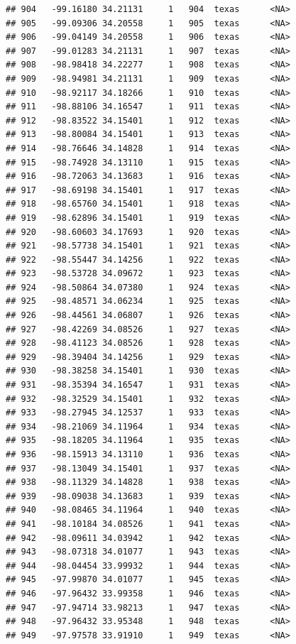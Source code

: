 \documentclass[
]{article}
\begin{document}
\begin{verbatim}
## 904   -99.16180 34.21131     1   904  texas      <NA>
## 905   -99.09306 34.20558     1   905  texas      <NA>
## 906   -99.04149 34.20558     1   906  texas      <NA>
## 907   -99.01283 34.21131     1   907  texas      <NA>
## 908   -98.98418 34.22277     1   908  texas      <NA>
## 909   -98.94981 34.21131     1   909  texas      <NA>
## 910   -98.92117 34.18266     1   910  texas      <NA>
## 911   -98.88106 34.16547     1   911  texas      <NA>
## 912   -98.83522 34.15401     1   912  texas      <NA>
## 913   -98.80084 34.15401     1   913  texas      <NA>
## 914   -98.76646 34.14828     1   914  texas      <NA>
## 915   -98.74928 34.13110     1   915  texas      <NA>
## 916   -98.72063 34.13683     1   916  texas      <NA>
## 917   -98.69198 34.15401     1   917  texas      <NA>
## 918   -98.65760 34.15401     1   918  texas      <NA>
## 919   -98.62896 34.15401     1   919  texas      <NA>
## 920   -98.60603 34.17693     1   920  texas      <NA>
## 921   -98.57738 34.15401     1   921  texas      <NA>
## 922   -98.55447 34.14256     1   922  texas      <NA>
## 923   -98.53728 34.09672     1   923  texas      <NA>
## 924   -98.50864 34.07380     1   924  texas      <NA>
## 925   -98.48571 34.06234     1   925  texas      <NA>
## 926   -98.44561 34.06807     1   926  texas      <NA>
## 927   -98.42269 34.08526     1   927  texas      <NA>
## 928   -98.41123 34.08526     1   928  texas      <NA>
## 929   -98.39404 34.14256     1   929  texas      <NA>
## 930   -98.38258 34.15401     1   930  texas      <NA>
## 931   -98.35394 34.16547     1   931  texas      <NA>
## 932   -98.32529 34.15401     1   932  texas      <NA>
## 933   -98.27945 34.12537     1   933  texas      <NA>
## 934   -98.21069 34.11964     1   934  texas      <NA>
## 935   -98.18205 34.11964     1   935  texas      <NA>
## 936   -98.15913 34.13110     1   936  texas      <NA>
## 937   -98.13049 34.15401     1   937  texas      <NA>
## 938   -98.11329 34.14828     1   938  texas      <NA>
## 939   -98.09038 34.13683     1   939  texas      <NA>
## 940   -98.08465 34.11964     1   940  texas      <NA>
## 941   -98.10184 34.08526     1   941  texas      <NA>
## 942   -98.09611 34.03942     1   942  texas      <NA>
## 943   -98.07318 34.01077     1   943  texas      <NA>
## 944   -98.04454 33.99932     1   944  texas      <NA>
## 945   -97.99870 34.01077     1   945  texas      <NA>
## 946   -97.96432 33.99358     1   946  texas      <NA>
## 947   -97.94714 33.98213     1   947  texas      <NA>
## 948   -97.96432 33.95348     1   948  texas      <NA>
## 949   -97.97578 33.91910     1   949  texas      <NA>

\end{verbatim}
\end{document}
